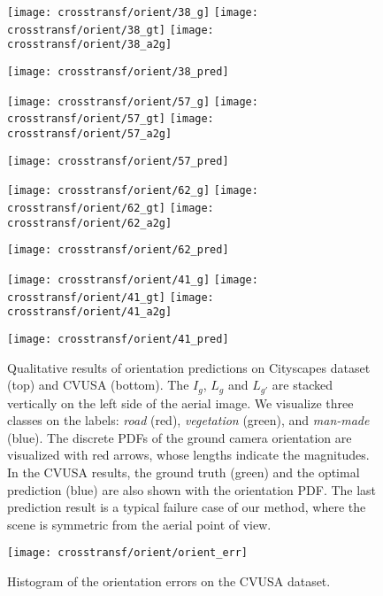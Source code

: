 \begin{figure*}
\vspace{5pt}
  \setlength{\aheight}{53.55pt}
  \setlength{\gwidth}{45.2625pt}
  \begin{minipage}[b]{\gwidth}
  \texttt{[image: crosstransf/orient/38\_g]}
  \texttt{[image: crosstransf/orient/38\_gt]}
  \texttt{[image: crosstransf/orient/38\_a2g]}
  \end{minipage}
  \texttt{[image: crosstransf/orient/38\_pred]}
  \hfill
  \begin{minipage}[b]{\gwidth}
  \texttt{[image: crosstransf/orient/57\_g]}
  \texttt{[image: crosstransf/orient/57\_gt]}
  \texttt{[image: crosstransf/orient/57\_a2g]}
  \end{minipage}
  \texttt{[image: crosstransf/orient/57\_pred]}
  \hfill
  \begin{minipage}[b]{\gwidth}
  \texttt{[image: crosstransf/orient/62\_g]}
  \texttt{[image: crosstransf/orient/62\_gt]}
  \texttt{[image: crosstransf/orient/62\_a2g]}
  \end{minipage}
  \texttt{[image: crosstransf/orient/62\_pred]}
  \hfill
  \begin{minipage}[b]{\gwidth}
  \texttt{[image: crosstransf/orient/41\_g]}
  \texttt{[image: crosstransf/orient/41\_gt]}
  \texttt{[image: crosstransf/orient/41\_a2g]}
  \end{minipage}
  \texttt{[image: crosstransf/orient/41\_pred]}

  \caption{Qualitative results of orientation predictions on Cityscapes
dataset (top) and CVUSA (bottom). The $I_g$, $L_g$ and
$L_{g'}$ are stacked vertically on the left side of the aerial image.
We visualize three classes on the labels:
    {\em road} (red), {\em vegetation} (green), and {\em man-made} 
    (blue).
The discrete PDFs of the ground camera orientation are visualized with
red arrows, whose lengths indicate the magnitudes. In the CVUSA
results, the ground truth (green) and the optimal prediction (blue)
are also shown with the orientation PDF. The last prediction result is
a typical failure case of our method, where the scene is symmetric
from the aerial point of view.}
  \label{fig:orient:qualitative}
\end{figure*}

\begin{figure}
	\centering
	\texttt{[image: crosstransf/orient/orient\_err]}
  \caption{Histogram of the orientation errors on the CVUSA dataset.}
	\label{fig:orient:err}
\end{figure}

